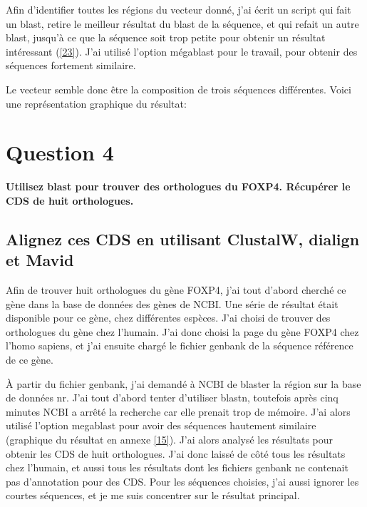 \documentclass[11pt]{article} %
\begin{document}
Afin d'identifier toutes les régions du vecteur donné, j'ai écrit un script qui fait un blast, retire le
meilleur résultat du blast de la séquence, et qui refait un autre blast, jusqu'à ce que la séquence soit trop
petite pour obtenir un résultat intéressant (\ref{23}). J'ai utilisé l'option mégablast pour le travail, pour 
obtenir des séquences fortement similaire.

Le vecteur semble donc être la composition de trois séquences différentes. Voici une représentation graphique du
résultat:


 
\section{Question 4} %

{\bf Utilisez blast pour trouver des orthologues du FOXP4. Récupérer le CDS de huit orthologues.}

\subsection[Alignement multiple]{Alignez ces CDS en utilisant ClustalW, dialign et Mavid}

Afin de trouver huit orthologues du gène FOXP4, j'ai tout d'abord cherché ce gène dans la base de données des
gènes de NCBI. Une série de résultat était disponible pour ce gène, chez différentes espèces. J'ai choisi de
trouver des orthologues du gène chez l'humain. J'ai donc choisi la page du gène FOXP4 chez l'homo sapiens,
et j'ai ensuite chargé le fichier genbank de la séquence référence de ce gène.

À partir du fichier genbank, j'ai demandé à NCBI de blaster la région sur la base de données nr. J'ai tout
d'abord tenter d'utiliser blastn, toutefois après cinq minutes NCBI a arrêté la recherche car elle prenait
trop de mémoire. J'ai alors utilisé l'option megablast pour avoir des séquences hautement similaire
(graphique du résultat en annexe \ref{15}). J'ai alors analysé les résultats pour obtenir les CDS de huit 
orthologues. J'ai donc laissé de côté tous les résultats chez l'humain, et aussi tous les résultats dont
les fichiers genbank ne contenait pas d'annotation pour des CDS. Pour les séquences choisies, j'ai aussi
ignorer les courtes séquences, et je me suis concentrer sur le résultat principal.
\end{document}

